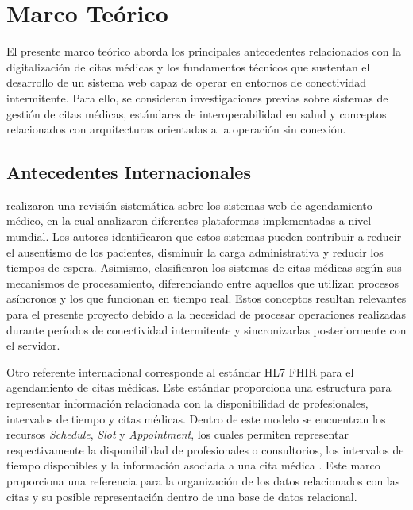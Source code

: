 
\section{Marco Teórico}

El presente marco teórico aborda los principales antecedentes relacionados con la digitalización de citas médicas y los fundamentos técnicos que sustentan el desarrollo de un sistema web capaz de operar en entornos de conectividad intermitente. Para ello, se consideran investigaciones previas sobre sistemas de gestión de citas médicas, estándares de interoperabilidad en salud y conceptos relacionados con arquitecturas orientadas a la operación sin conexión.

\subsection{Antecedentes Internacionales}

\textcite{zhao2017} realizaron una revisión sistemática sobre los sistemas web de agendamiento médico, en la cual analizaron diferentes plataformas implementadas a nivel mundial. Los autores identificaron que estos sistemas pueden contribuir a reducir el ausentismo de los pacientes, disminuir la carga administrativa y reducir los tiempos de espera. Asimismo, clasificaron los sistemas de citas médicas según sus mecanismos de procesamiento, diferenciando entre aquellos que utilizan procesos asíncronos y los que funcionan en tiempo real. Estos conceptos resultan relevantes para el presente proyecto debido a la necesidad de procesar operaciones realizadas durante períodos de conectividad intermitente y sincronizarlas posteriormente con el servidor.

Otro referente internacional corresponde al estándar HL7 FHIR para el agendamiento de citas médicas. Este estándar proporciona una estructura para representar información relacionada con la disponibilidad de profesionales, intervalos de tiempo y citas médicas. Dentro de este modelo se encuentran los recursos \textit{Schedule}, \textit{Slot} y \textit{Appointment}, los cuales permiten representar respectivamente la disponibilidad de profesionales o consultorios, los intervalos de tiempo disponibles y la información asociada a una cita médica \parencite{santenet2026}. Este marco proporciona una referencia para la organización de los datos relacionados con las citas y su posible representación dentro de una base de datos relacional.

